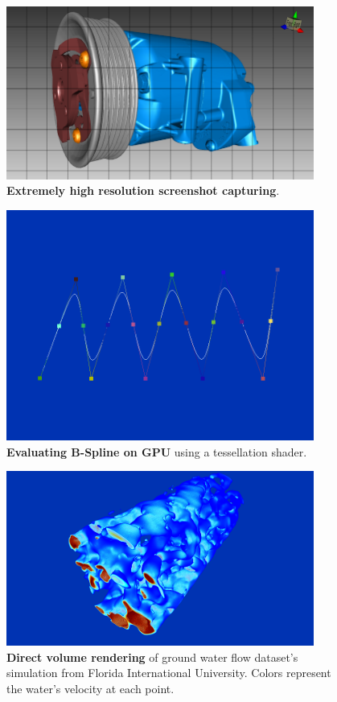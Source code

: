 \documentclass[]{report}
\begin{document}
\begin{figure}[!ht]
	\centering
	\includegraphics[width=0.90\textwidth]{./figs/highresscreenshot.png}
	\caption[Extremely high resolution screenshot capturing]{\textbf{Extremely high resolution screenshot capturing}.}
	\label{fig:highres}
\end{figure}

\begin{figure}[!ht]
	\centering
	\includegraphics[width=0.90\textwidth]{./figs/bspline.png}
	\caption[B-Spline GPU Tessellation]{\textbf{Evaluating B-Spline on GPU} using a tessellation shader.}
	\label{fig:bspline}
\end{figure}

\begin{figure}[!ht]
	\centering
	\includegraphics[width=0.90\textwidth]{./figs/dvr.png}
	\caption[Direct volume rendering]{\textbf{Direct volume rendering} of ground water flow dataset's simulation from Florida International University. Colors represent the water's velocity at each point.}
	\label{fig:dvr}
\end{figure}
\end{document}
